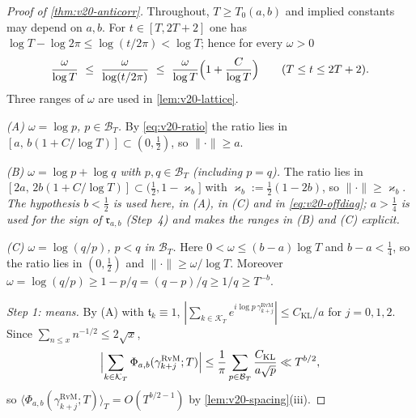 \documentclass[11pt,a4paper]{article}
\numberwithin{equation}{section}
\theoremstyle{definition}
\theoremstyle{remark}
\begin{document}
\begin{proof}[Proof of \cref{thm:v20-anticorr}]
Throughout, $T\ge T_0(a,b)$ and implied constants may depend on $a,b$. For $t\in[T,2T+2]$ one has $\log T-\log2\pi\le\log(t/2\pi)<\log T$; hence for every $\omega>0$
\begin{equation}\label{eq:v20-ratio}
 \frac{\omega}{\log T}\ \le\ \frac{\omega}{\log(t/2\pi)}\ \le\ \frac{\omega}{\log T}\Bigl(1+\frac C{\log T}\Bigr)\qquad(T\le t\le2T+2).
\end{equation}
Three ranges of $\omega$ are used in \cref{lem:v20-lattice}.

\emph{(A) $\omega=\log p$, $p\in\mathcal B_T$.} By \eqref{eq:v20-ratio} the ratio lies in $[a,\,b(1+C/\log T)]\subset(0,\frac12)$, so $\|\cdot\|\ge a$.

\emph{(B) $\omega=\log p+\log q$ with $p,q\in\mathcal B_T$ (including $p=q$).} The ratio lies in $[2a,\,2b(1+C/\log T)]\subset(\frac12,1-\varkappa_b]$ with $\varkappa_b:=\frac12(1-2b)$, so $\|\cdot\|\ge\varkappa_b$. \emph{The hypothesis $b<\frac12$ is used here, in (A), in (C) and in \eqref{eq:v20-offdiag}; $a>\frac14$ is used for the sign of $\mathfrak r_{a,b}$ (Step~4) and makes the ranges in (B) and (C) explicit.}

\emph{(C) $\omega=\log(q/p)$, $p<q$ in $\mathcal B_T$.} Here $0<\omega\le(b-a)\log T$ and $b-a<\frac14$, so the ratio lies in $(0,\frac12)$ and $\|\cdot\|\ge\omega/\log T$. Moreover $\omega=\log(q/p)\ge1-p/q=(q-p)/q\ge1/q\ge T^{-b}$.

\emph{Step 1: means.} By (A) with $\mathfrak t_k\equiv1$, $|\sum_{k\in\mathcal K_T}e^{i\log p\,\gamma^{\mathrm{RvM}}_{k+j}}|\le C_{\mathrm{KL}}/a$ for $j=0,1,2$. Since $\sum_{n\le x}n^{-1/2}\le2\sqrt x$,
\begin{equation}
 \Bigl|\sum_{k\in\mathcal K_T}\Phi_{a,b}(\gamma^{\mathrm{RvM}}_{k+j};T)\Bigr|\le\frac1\pi\sum_{p\in\mathcal B_T}\frac{C_{\mathrm{KL}}}{a\sqrt p}\ll T^{b/2},
\end{equation}
so $\langle\Phi_{a,b}(\gamma^{\mathrm{RvM}}_{k+j};T)\rangle_T=O(T^{b/2-1})$ by \cref{lem:v20-spacing}(iii).


\end{proof}
\end{document}
